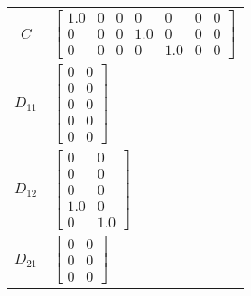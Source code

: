 \begin{tabular}{cl}
   $C$    & $\left[\begin{matrix}1.0 & 0 & 0 & 0 & 0 & 0 & 0\\0 & 0 & 0 & 1.0 & 0 & 0 & 0\\0 & 0 & 0 & 0 & 1.0 & 0 & 0\end{matrix}\right]$                                                                                                                                                                         \\
 $D_{11}$ & $\left[\begin{matrix}0 & 0\\0 & 0\\0 & 0\\0 & 0\\0 & 0\end{matrix}\right]$                                                                                                                                                                                                                             \\
 $D_{12}$ & $\left[\begin{matrix}0 & 0\\0 & 0\\0 & 0\\1.0 & 0\\0 & 1.0\end{matrix}\right]$                                                                                                                                                                                                                         \\
 $D_{21}$ & $\left[\begin{matrix}0 & 0\\0 & 0\\0 & 0\end{matrix}\right]$                                                                                                                                                                                                                                           \\
\hline
\end{tabular}